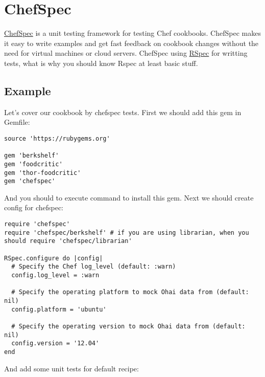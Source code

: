 \section{ChefSpec}
\label{sec:testing-chefspec}

\href{http://code.sethvargo.com/chefspec/}{ChefSpec} is a unit testing framework for testing Chef cookbooks. ChefSpec makes it easy to write examples and get fast feedback on cookbook changes without the need for virtual machines or cloud servers. ChefSpec using \href{http://rspec.info/}{RSpec} for writting tests, what is why you should know Rspec at least basic stuff.

\subsection{Example}

Let's cover our cookbook by chefspec tests. First we should add this gem in Gemfile:

\begin{lstlisting}[label=lst:testing-chefspec1]
source 'https://rubygems.org'

gem 'berkshelf'
gem 'foodcritic'
gem 'thor-foodcritic'
gem 'chefspec'
\end{lstlisting}

And you should to execute  command to install this gem. Next we should create config for chefspec:

\begin{lstlisting}[label=lst:testing-chefspec2,title=my-server-cloud/site-cookbooks/my\_cool\_app/spec/spec\_helper.rb]
require 'chefspec'
require 'chefspec/berkshelf' # if you are using librarian, when you should require 'chefspec/librarian'

RSpec.configure do |config|
  # Specify the Chef log_level (default: :warn)
  config.log_level = :warn

  # Specify the operating platform to mock Ohai data from (default: nil)
  config.platform = 'ubuntu'

  # Specify the operating version to mock Ohai data from (default: nil)
  config.version = '12.04'
end
\end{lstlisting}

And add some unit tests for default recipe:

